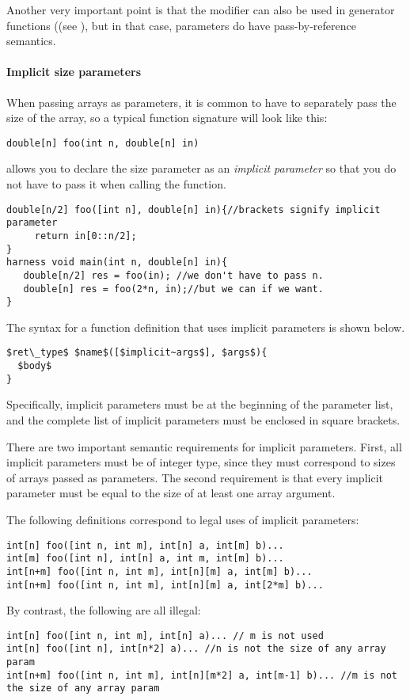 Another very important point is that the  modifier can also be used in generator functions ((see ), but in that case,  parameters do have pass-by-reference semantics.


\paragraph{Implicit size parameters}

When passing arrays as parameters, it is common to have to separately pass the size of the array, so a typical function signature will look like this:
\begin{lstlisting}
double[n] foo(int n, double[n] in)
\end{lstlisting}

\Sk{} allows you to declare the size parameter  as an \emph{implicit parameter} so that you do not have to pass it when calling the function.

\begin{lstlisting}
double[n/2] foo([int n], double[n] in){//brackets signify implicit parameter
     return in[0::n/2];
}
harness void main(int n, double[n] in){
   double[n/2] res = foo(in); //we don't have to pass n.
   double[n] res = foo(2*n, in);//but we can if we want.
}
\end{lstlisting}

The syntax for a function definition that uses implicit parameters is shown below. 
\begin{lstlisting}
$ret\_type$ $name$([$implicit~args$], $args$){
  $body$
}
\end{lstlisting}
Specifically, implicit parameters must be at the beginning of the parameter list, and the complete list of implicit parameters must be enclosed in square brackets.

There are two important semantic requirements for implicit parameters. First, all implicit parameters must be of integer type, since they must correspond to sizes of arrays passed as parameters. The second requirement is that every implicit parameter must be equal to the size of at least one array argument.

\begin{Example}
The following definitions correspond to legal uses of implicit parameters:
\begin{lstlisting}
int[n] foo([int n, int m], int[n] a, int[m] b)...
int[m] foo([int n], int[n] a, int m, int[m] b)...
int[n+m] foo([int n, int m], int[n][m] a, int[m] b)...
int[n+m] foo([int n, int m], int[n][m] a, int[2*m] b)...
\end{lstlisting}
By contrast, the following are all illegal:
\begin{lstlisting}
int[n] foo([int n, int m], int[n] a)... // m is not used
int[n] foo([int n], int[n*2] a)... //n is not the size of any array param
int[n+m] foo([int n, int m], int[n][m*2] a, int[m-1] b)... //m is not the size of any array param
\end{lstlisting}
\end{Example}

